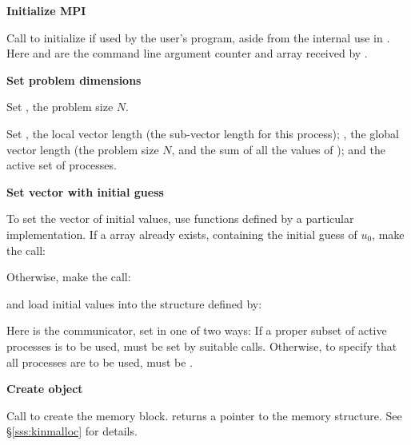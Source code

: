 \begin{Steps}
  
\item 
  {\bf {\p} Initialize MPI}

  Call  to initialize {\mpi} if used by
  the user's program, aside from the internal use in {\nvecp}.  
  Here  and  are the command line argument 
  counter and array received by .
  
\item
  {\bf Set problem dimensions}

  {\s} Set , the problem size $N$.

  {\p} Set , the local vector length (the sub-vector
  length for this process); , the global vector length (the
  problem size $N$, and the sum of all the values of );
  and the active set of processes.
  
\item
  {\bf Set vector with initial guess}
 
  To set the vector  of initial values, use functions defined by a
  particular {\nvector} implementation.  If a  array  
  already exists, containing the initial guess of $u_0$, make the call:

  {\s} 

  {\p} 

  Otherwise, make the call:

  {\s} 

  {\p} 

  and load initial values into the structure defined by:

  {\s} 

  {\p} 

  Here  is the {\mpi} communicator, set in one of two ways: 
  If a proper subset of active processes is to be used,  
  must be set by suitable {\mpi} calls. Otherwise, to specify that all 
  processes are to be used,  must be .
  
\item\label{i:kinsol_create} 
  {\bf Create {\kinsol} object}

  Call  to create the {\kinsol} memory block.
   returns a pointer to the {\kinsol} memory structure.
  See \S\ref{sss:kinmalloc} for details.


\end{Steps}
